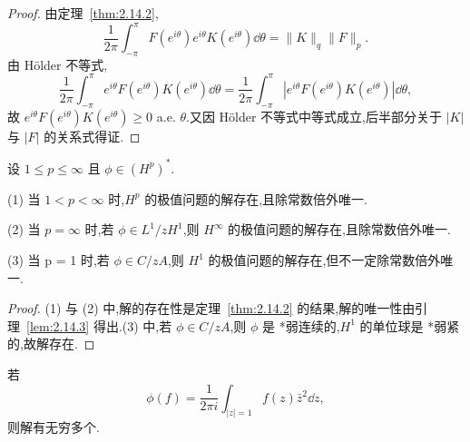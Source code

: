 \begin{proof}
由定理~\ref{thm:2.14.2},
\begin{equation*}
\frac{1}{2\pi}\int_{-\pi}^{\pi} F(e^{i\theta}) e^{i\theta} K(e^{i\theta})\dd \theta = \|K\|_{q}\|F\|_{p}.
\end{equation*}
由 Hölder 不等式,
\begin{equation*}
\frac{1}{2\pi}\int_{-\pi}^{\pi} e^{i\theta} F(e^{i\theta}) K(e^{i\theta})\dd \theta = \frac{1}{2\pi}\int_{-\pi}^{\pi} |e^{i\theta} F(e^{i\theta}) K(e^{i\theta})|\dd \theta,
\end{equation*}
故 $e^{i\theta}F(e^{i\theta})K(e^{i\theta}) \geq 0$ a.e. $\theta$.又因 Hölder 不等式中等式成立,后半部分关于 $|K|$ 与 $|F|$ 的关系式得证.
\end{proof}

\begin{theorem}\label{thm:2.14.4}
设 $1 \leq p \leq \infty$ 且 $\phi \in (H^{p})^{*}$.

(1) 当 $1 < p < \infty$ 时,$H^{p}$ 的极值问题的解存在,且除常数倍外唯一.

(2) 当 $p = \infty$ 时,若 $\phi \in L^{1}/zH^{1}$,则 $H^{\infty}$ 的极值问题的解存在,且除常数倍外唯一.

(3) 当 p = 1 时,若 $\phi \in C/zA$,则 $H^{1}$ 的极值问题的解存在,但不一定除常数倍外唯一.
\end{theorem}

\begin{proof}
(1) 与 (2) 中,解的存在性是定理~\ref{thm:2.14.2} 的结果,解的唯一性由引理~\ref{lem:2.14.3} 得出.(3) 中,若 $\phi \in C/zA$,则 $\phi$ 是 *弱连续的,$H^{1}$ 的单位球是 *弱紧的,故解存在.
\end{proof}

若
\begin{equation*}
\phi(f) = \frac{1}{2\pi i}\int_{|z|=1} f(z)\bar{z}^{2}\dd z,
\end{equation*}
则解有无穷多个.
